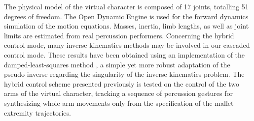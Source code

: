 



The physical model of the virtual character is composed of 17 joints, totalling 51 degrees of freedom. The Open Dynamic Engine  is used for the forward dynamics simulation of the motion equations. Masses, inertia, limb lengths, as well as joint limits are estimated from real percussion performers. Concerning the hybrid control mode, many inverse kinematics methods may be involved in our cascaded control mode. These results have been obtained using an implementation of the damped-least-squares method \cite{wampler:SMC86}, a simple yet more robust adaptation of the pseudo-inverse regarding the singularity of the inverse kinematics problem. The hybrid control scheme presented previously is tested on the control of the two arms of the virtual character, tracking a sequence of percussion gestures for synthesizing whole arm movements only from the specification of the mallet extremity trajectories.

